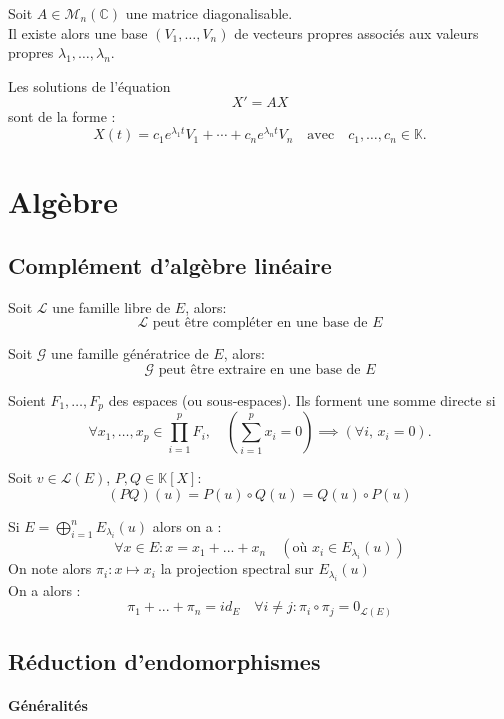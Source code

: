 \documentclass[a4paper,12pt]{report}
\newcommand{\Def}[2]{\begin{tcolorbox}[colback=white,colframe=CornflowerBlue, title=Définition : #1]#2\end{tcolorbox}}
\newcommand{\Thm}[2]{\begin{tcolorbox}[colback=white,colframe=Red!60, title=Théorème : #1]#2\end{tcolorbox}}
\def\K{\mathbb{K}}
\begin{document}
\Thm{Solution pour coefficients constants (cas diagonalisable) }{
Soit $A \in \mathcal{M}_n(\mathbb{C})$ une matrice diagonalisable. \\
Il existe alors une base $(V_1, \dots, V_n)$ de vecteurs propres associés aux valeurs propres $\lambda_1, \dots, \lambda_n$.

Les solutions de l’équation
\[
X' = AX
\]
sont de la forme :
\[
X(t) = c_1 e^{\lambda_1 t} V_1 + \cdots + c_n e^{\lambda_n t} V_n
\quad \text{avec} \quad c_1, \dots, c_n \in \mathbb{K}.
\]
}



\chapter{Algèbre}
\section{Complément d'algèbre linéaire}
\Thm{De la base incomplète}{
    Soit $\mathcal L$ une famille libre de $E$, alors:
    \[\mathcal L \text{ peut être compléter en une base de $E$}\]
}
\Thm{De la base extraite}{
    Soit $\mathcal G$ une famille génératrice de $E$, alors:
    \[\mathcal G \text{ peut être extraire en une base de $E$}\]
}
\Thm{Caractérisation des sommes directes}{
  Soient $F_1, \dots, F_p$ des espaces (ou sous-espaces). Ils forment une somme directe si
  \[
    \forall x_1, \dots, x_p \in \prod_{i=1}^p F_i, \quad \left( \sum_{i=1}^p x_i = 0 \right) \implies \left( \forall i,\, x_i = 0 \right).
  \]
}

\Thm{Propriété 2 polynômes d'endomorphisme}{
  Soit $v\in\mathcal{L}(E)$, $P,Q\in\K[X]$:
  \[(PQ)(u)=P(u)\circ Q(u)=Q(u)\circ P(u)\]
}

\Def{Projecteur spectral}{
  Si $E = \bigoplus_{i=1}^n E_{\lambda_i}(u)$ alors on a : \[\forall x \in E : x= x_1+...+x_n \quad(\text{où $x_i\in E_{\lambda_i}(u)$})\]
  On note alors $\pi_i : x\mapsto x_i$ la projection spectral sur $E_{\lambda_i}(u)$\\
  On a alors :
  \[ \pi_1+...+\pi_n = id_E \quad \forall i\neq j: \pi_i \circ \pi_j = 0_{\mathcal{L}(E)}\]
}

\section{Réduction d'endomorphismes}
\subsubsection{Généralités}
\end{document}
